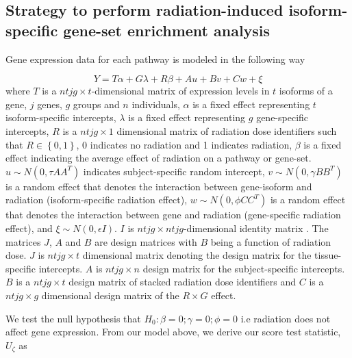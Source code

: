 \documentclass[hidelinks,11pt]{article}
\begin{document}
\subsection*{Strategy to perform radiation-induced isoform-specific gene-set enrichment analysis}

Gene expression data for each pathway is modeled in the following way 

\begin{equation}
Y = T\alpha + G\lambda + R\beta + Au + Bv + Cw + \xi
\end{equation}
where $T$ is a $ntjg \times t$-dimensional matrix of expression levels in $t$ isoforms of a gene, $j$ genes, $g$ groups and $n$ individuals, $\alpha$ is a fixed effect representing $t$ isoform-specific intercepts, $\lambda$ is a fixed effect representing $g$ gene-specific intercepts, $R$ is a $ntjg \times 1$ dimensional matrix of radiation dose identifiers such that $R\in\left\{0,1\right\}$, 0 indicates no radiation and 1 indicates radiation, $\beta$ is a fixed effect indicating the average effect of radiation on a pathway or gene-set. $u \sim N\left(0, \tau AA^T \right)$ indicates subject-specific random intercept, $v \sim N\left(0,\gamma BB^T \right)$ is a random effect that denotes the interaction between gene-isoform and radiation (isoform-specific radiation effect), $w \sim N\left(0,\phi CC^T \right)$ is a random effect that denotes the interaction between gene and radiation (gene-specific radiation effect), and $\xi \sim N\left(0, \epsilon I \right)$. $I$ is $ntjg \times ntjg$-dimensional identity matrix . The matrices $J$, $A$ and $B$ are design matrices with $B$ being a function of radiation dose. $J$ is $ntjg \times t$ dimensional matrix denoting the design matrix for the tissue-specific intercepts. $A$ is $ntjg \times n$ design matrix for the subject-specific intercepts. $B$ is a $ntjg \times t$ design matrix of stacked radiation dose identifiers and $C$ is a $ntjg \times g$ dimensional design matrix of the $R \times G$ effect. 

We test the null hypothesis that  $H_0: \beta = 0; \gamma=0; \phi=0$ i.e radiation does not affect gene expression. From our model above, we derive our score test statistic, $U_\zeta$ as
\end{document}
